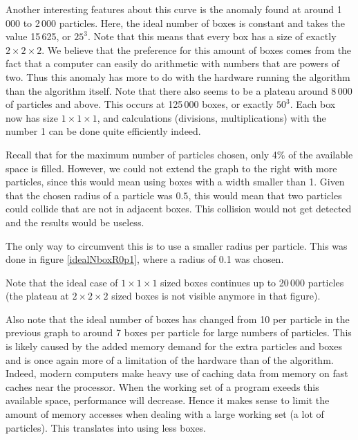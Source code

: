 Another interesting features about this curve is the anomaly found at 
around 1\,000 to 2\,000 particles. Here, the ideal number of boxes is 
constant and takes the value 15\,625, or $25^3$. Note that this means that 
every box has a size of exactly $2 \times 2 \times 2$. We believe that the 
preference for this amount of boxes comes from the fact that a computer can 
easily do arithmetic with numbers that are powers of two. Thus this anomaly 
has more to do with the hardware running the algorithm than the algorithm 
itself. Note that there also seems to be a plateau around 8\,000 of particles 
and above. This occurs at 125\,000 boxes, or exactly $50^3$. Each box now has 
size $1 \times 1 \times 1$, and calculations (divisions, multiplications) with 
the number 1 can be done quite efficiently indeed.

Recall that for the maximum number of particles chosen, only 4\% of the 
available space is filled. However, we could not extend the graph to the 
right with more particles, since this would mean using boxes with a width 
smaller than 1. Given that the chosen radius of a particle was $0.5$, this 
would mean that two particles could collide that are not in adjacent boxes.  
This collision would not get detected and the results would be useless.

The only way to circumvent this is to use a smaller radius per particle.  
This was done in figure \ref{idealNboxR0p1}, where a radius of 0.1 was 
chosen.



Note that the ideal case of $1 \times 1 \times 1$ sized boxes continues up 
to 20\,000 particles (the plateau at $2 \times 2 \times 2$ sized boxes is 
not visible anymore in that figure).

Also note that the ideal number of boxes has changed from 10 per particle 
in the previous graph to around 7 boxes per particle for large numbers of 
particles. This is likely caused by the added memory demand for the extra 
particles and boxes and is once again more of a limitation of the hardware 
than of the algorithm. Indeed, modern computers make heavy use of caching 
data from memory on fast caches near the processor. When the working set of 
a program exeeds this available space, performance will decrease. Hence it 
makes sense to limit the amount of memory accesses when dealing with a 
large working set (a lot of particles). This translates into using less 
boxes.

